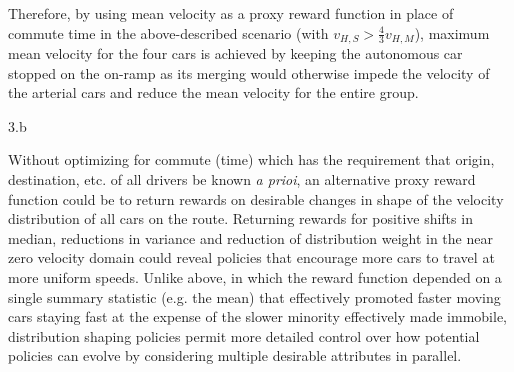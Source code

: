 \begin{answer}
  Therefore, by using mean velocity as a proxy reward function in place of commute time in the above-described scenario 
  (with $v_{H,S} > \frac{4}{3} v_{H,M}$), maximum mean velocity for the four cars is achieved by keeping the autonomous car stopped on the 
  on-ramp as its merging would otherwise impede the velocity of the arterial cars and reduce the mean velocity for the entire group.
\end{answer}
\clearpage


\LARGE
3.b
\normalsize

\begin{answer}
  Without optimizing for commute (time) which has the requirement that origin, destination, etc. of all drivers be known
  \textit{a prioi}, an alternative proxy reward function could be to return rewards on desirable changes in shape of the velocity
  distribution of all cars on the route. Returning rewards for positive shifts in median, reductions in variance
  and reduction of distribution weight in the near zero velocity domain could reveal policies that encourage more cars to travel
  at more uniform speeds. Unlike above, in which the reward function depended on a single summary statistic (e.g. the mean) that
  effectively promoted faster moving cars staying fast at the expense of the slower minority effectively made
  immobile, distribution shaping policies permit more detailed control over how potential policies can evolve by considering
  multiple desirable attributes in parallel.
\end{answer}
\clearpage



